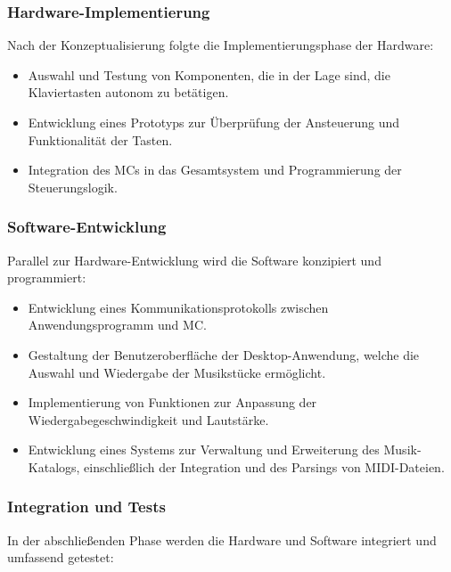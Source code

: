 \subsubsection{Hardware-Implementierung}\label{Vorgehensweise - Hardware-Implementierung}

Nach der Konzeptualisierung folgte die Implementierungsphase der Hardware:

\begin{itemize}
    \item Auswahl und Testung von Komponenten, die in der Lage sind, die Klaviertasten autonom zu betätigen.
    \item Entwicklung eines Prototyps zur Überprüfung der Ansteuerung und Funktionalität der Tasten.
    \item Integration des \ac{MC}s in das Gesamtsystem und Programmierung der Steuerungslogik. %
\end{itemize}

\subsubsection{Software-Entwicklung}\label{Vorgehensweise - Software-Entwicklung}

Parallel zur Hardware-Entwicklung wird die Software konzipiert und programmiert:

\begin{itemize}
    \item Entwicklung eines Kommunikationsprotokolls zwischen Anwendungsprogramm und \ac{MC}.
    \item Gestaltung der Benutzeroberfläche der Desktop-Anwendung, welche die Auswahl und Wiedergabe der Musikstücke ermöglicht.
    \item Implementierung von Funktionen zur Anpassung der Wiedergabegeschwindigkeit und Lautstärke.
    \item Entwicklung eines Systems zur Verwaltung und Erweiterung des Musik-Katalogs, einschließlich der Integration und des Parsings von MIDI-Dateien.
\end{itemize}

\subsubsection{Integration und Tests}\label{Vorgehensweise - Integration und Tests}

In der abschließenden Phase werden die Hardware und Software integriert und umfassend getestet:

